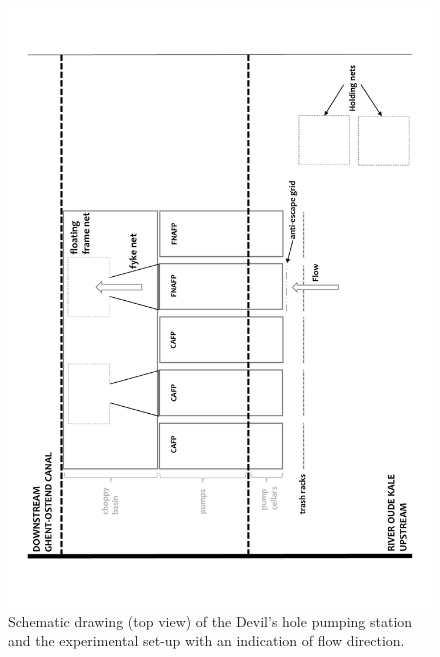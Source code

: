 \documentclass[fleqn,10pt]{wlscirep}
\begin{document}
\begin{figure}[ht]
  \centering
  \includegraphics[scale=0.5,angle=-90]{Figuur schematische weergaven pompstations.pdf}
  \caption{Schematic drawing (top view) of the Devil’s hole pumping station and the experimental set-up with an indication of flow direction.}
  \label{fig:scheme}
\end{figure}
\end{document}
